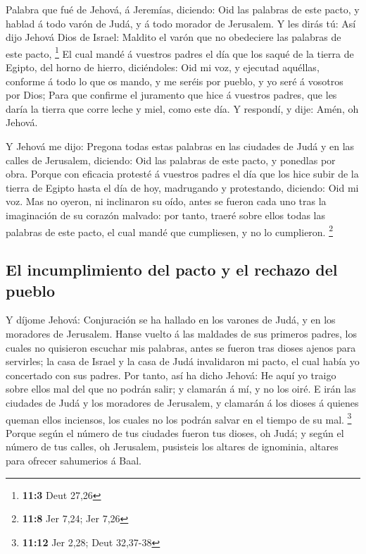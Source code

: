  Palabra que fué de Jehová, á Jeremías, diciendo:
 Oid las palabras de este pacto, y hablad á todo varón de
Judá, y á todo morador de Jerusalem.  Y les dirás tú: Así
dijo Jehová Dios de Israel: Maldito el varón que no obedeciere las
palabras de este pacto, \footnote{\textbf{11:3} Deut 27,26}
 El cual mandé á vuestros padres el día que los saqué de
la tierra de Egipto, del horno de hierro, diciéndoles: Oid mi voz, y
ejecutad aquéllas, conforme á todo lo que os mando, y me seréis por
pueblo, y yo seré á vosotros por Dios;  Para que confirme
el juramento que hice á vuestros padres, que les daría la tierra que
corre leche y miel, como este día. Y respondí, y dije: Amén, oh Jehová.

 Y Jehová me dijo: Pregona todas estas palabras en las
ciudades de Judá y en las calles de Jerusalem, diciendo: Oid las
palabras de este pacto, y ponedlas por obra.  Porque con
eficacia protesté á vuestros padres el día que los hice subir de la
tierra de Egipto hasta el día de hoy, madrugando y protestando,
diciendo: Oid mi voz.  Mas no oyeron, ni inclinaron su
oído, antes se fueron cada uno tras la imaginación de su corazón
malvado: por tanto, traeré sobre ellos todas las palabras de este pacto,
el cual mandé que cumpliesen, y no lo cumplieron. \footnote{\textbf{11:8}
  Jer 7,24; Jer 7,26}

\hypertarget{el-incumplimiento-del-pacto-y-el-rechazo-del-pueblo}{%
\subsection{El incumplimiento del pacto y el rechazo del
pueblo}\label{el-incumplimiento-del-pacto-y-el-rechazo-del-pueblo}}

 Y díjome Jehová: Conjuración se ha hallado en los varones
de Judá, y en los moradores de Jerusalem.  Hanse vuelto á
las maldades de sus primeros padres, los cuales no quisieron escuchar
mis palabras, antes se fueron tras dioses ajenos para servirles; la casa
de Israel y la casa de Judá invalidaron mi pacto, el cual había yo
concertado con sus padres.  Por tanto, así ha dicho
Jehová: He aquí yo traigo sobre ellos mal del que no podrán salir; y
clamarán á mí, y no los oiré.  E irán las ciudades de
Judá y los moradores de Jerusalem, y clamarán á los dioses á quienes
queman ellos inciensos, los cuales no los podrán salvar en el tiempo de
su mal. \footnote{\textbf{11:12} Jer 2,28; Deut 32,37-38}
 Porque según el número de tus ciudades fueron tus
dioses, oh Judá; y según el número de tus calles, oh Jerusalem,
pusisteis los altares de ignominia, altares para ofrecer sahumerios á
Baal.

